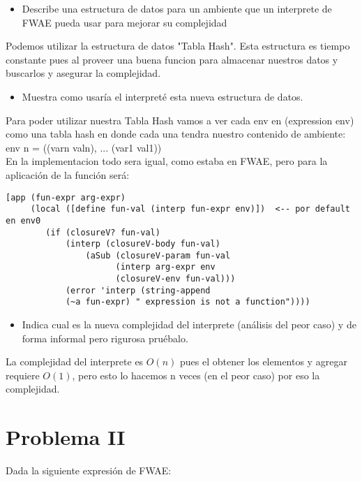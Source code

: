 \documentclass[letterpaper,11pt]{article}
\begin{document}
\begin{itemize}
\item Describe una estructura de datos para un ambiente que un interprete de FWAE pueda usar para mejorar su
complejidad
\end{itemize}

Podemos utilizar la estructura de datos "Tabla Hash". Esta estructura es tiempo constante pues al proveer una buena funcion para almacenar nuestros datos y buscarlos y asegurar la complejidad.

\begin{itemize}
\item Muestra como usaría el interpreté esta nueva estructura de datos.
\end{itemize}
Para poder utilizar nuestra Tabla Hash vamos a ver cada env en (expression env) como una tabla hash en donde cada una tendra nuestro contenido de ambiente:\\
env n = ((varn valn), ... (var1 val1))\\
En la implementacion todo sera igual, como estaba en FWAE, pero para la aplicación de la función será:\\
\begin{verbatim}
[app (fun-expr arg-expr)
     (local ([define fun-val (interp fun-expr env)])  <-- por default en env0
        (if (closureV? fun-val)
            (interp (closureV-body fun-val)
                (aSub (closureV-param fun-val
                      (interp arg-expr env
                      (closureV-env fun-val)))
            (error 'interp (string-append 
            (~a fun-expr) " expression is not a function"))))
\end{verbatim}

\begin{itemize}
\item Indica cual es la nueva complejidad del interprete (análisis del peor caso) y de forma informal pero rigurosa pruébalo.
\end{itemize}

La complejidad del interprete es $O(n)$ pues el obtener los elementos y agregar requiere $O(1)$, pero esto lo hacemos n veces (en el peor caso) por eso la complejidad.\\



\section{Problema II}
Dada la siguiente expresión de FWAE: 
\end{document}
